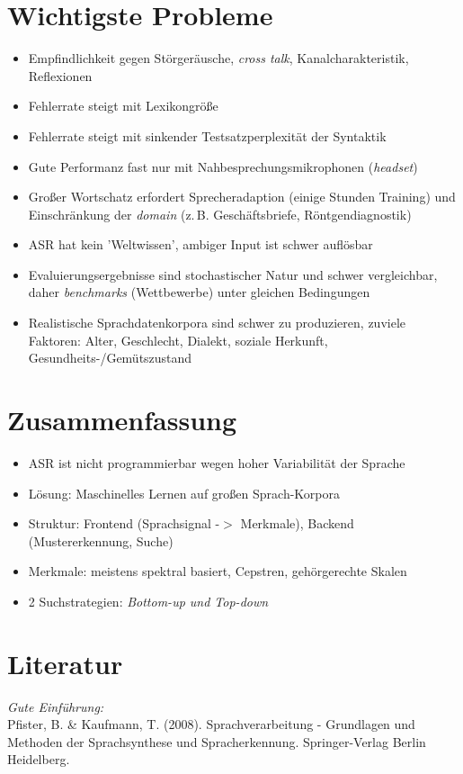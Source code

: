 \documentclass[11pt]{book}
\newcommand{\begi}{\begin{itemize} \setlength{\itemsep}{0.2cm}}
\newcommand{\ndit}{\end{itemize}}
\begin{document}
\section{Wichtigste Probleme}
\begi
\item Empfindlichkeit gegen Störgeräusche, {\em cross talk}, Kanalcharakteristik, Reflexionen
\item Fehlerrate steigt mit Lexikongröße
\item Fehlerrate steigt mit sinkender Testsatzperplexität der Syntaktik
\item Gute Performanz fast nur mit Nahbesprechungsmikrophonen ({\em headset})
\item Großer Wortschatz erfordert Sprecheradaption (einige Stunden Training) und 
Einschränkung der {\em domain} (z.\,B. Geschäftsbriefe, Röntgendiagnostik)
\item ASR hat kein 'Weltwissen', ambiger Input ist schwer auflösbar
\item Evaluierungsergebnisse sind stochastischer Natur und schwer vergleichbar,
daher {\em benchmarks} (Wettbewerbe) unter gleichen Bedingungen
\item Realistische Sprachdatenkorpora sind schwer zu produzieren, zuviele Faktoren:
Alter, Geschlecht, Dialekt, soziale Herkunft, Gesundheits-/Gemütszustand
\ndit

\section{Zusammenfassung}
\begi
\item ASR ist nicht programmierbar wegen hoher Variabilität der Sprache
\item Lösung: Maschinelles Lernen auf großen Sprach-Korpora
\item Struktur: Frontend (Sprachsignal -$>$ Merkmale), Backend (Mustererkennung, Suche)
\item Merkmale: meistens spektral basiert, Cepstren, gehörgerechte Skalen
\item 2 Suchstrategien: {\em Bottom-up und Top-down}
\ndit

\section{Literatur}

        {\em Gute Einführung:}\\
        Pfister, B. \& Kaufmann, T. (2008). Sprachverarbeitung - Grundlagen und 
	Methoden der Sprachsynthese und Spracherkennung. 
	Springer-Verlag Berlin Heidelberg.
\end{document}
